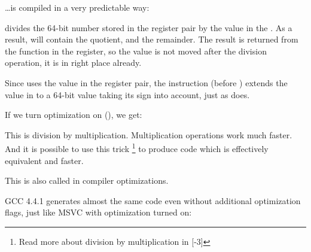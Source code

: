 ﻿

\dots is compiled in a very predictable way:




\IDIV divides the 64-bit number stored in the  register pair by the value in the \ECX.
As a result, \EAX will contain the \gls{quotient}, and \EDX\EMDASH{}the remainder.
The result is returned from the \ttf function in the \EAX register, 
so the value is not moved after the division 
operation, it is in right place already.

Since \IDIV uses the value in the  register pair, the  instruction (before \IDIV) extends 
the value in \EAX to a 64-bit value taking its sign into account, just as \MOVSX does.

If we turn optimization on (\Ox), we get:



This is division by multiplication. Multiplication operations work much faster. 
And it is possible to use this trick
\footnote{Read more about division by multiplication in [-3]}
to produce code which is effectively equivalent and faster.

This is also called  in compiler optimizations.

GCC 4.4.1 generates almost the same code even without additional optimization flags, 
just like MSVC with optimization turned on:


